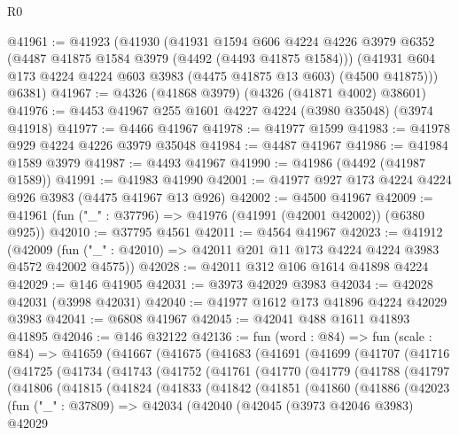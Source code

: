 \begin{lexlean}{R0}
\begin{coremodule}
@41961 := @41923
    (@41930
      (@41931
        @1594
        @606
        @4224
        @4226
        @3979
        @6352
        (@4487 @41875 @1584 @3979 (@4492 (@4493 @41875 @1584)))
        (@41931 @604 @173 @4224 @4224 @603 @3983 (@4475 @41875 @13 @603) (@4500 @41875)))
      @6381)
@41967 := @4326 (@41868 @3979) (@4326 (@41871 @4002) @38601)
@41976 := @4453 @41967 @255 @1601 @4227 @4224 (@3980 @35048) (@3974 @41918)
@41977 := @4466 @41967
@41978 := @41977 @1599
@41983 := @41978 @929 @4224 @4226 @3979 @35048
@41984 := @4487 @41967
@41986 := @41984 @1589 @3979
@41987 := @4493 @41967
@41990 := @41986 (@4492 (@41987 @1589))
@41991 := @41983 @41990
@42001 := @41977 @927 @173 @4224 @4224 @926 @3983 (@4475 @41967 @13 @926)
@42002 := @4500 @41967
@42009 := @41961 (fun ("_" : @37796) => @41976 (@41991 (@42001 @42002)) (@6380 @925))
@42010 := @37795 @4561
@42011 := @4564 @41967
@42023 := @41912
    (@42009 (fun ("_" : @42010) => @42011 @201 @11 @173 @4224 @4224 @3983 @4572 @42002 @4575))
@42028 := @42011 @312 @106 @1614 @41898 @4224
@42029 := @146 @41905
@42031 := @3973 @42029 @3983
@42034 := @42028 @42031 (@3998 @42031)
@42040 := @41977 @1612 @173 @41896 @4224 @42029 @3983
@42041 := @6808 @41967
@42045 := @42041 @488 @1611 @41893 @41895
@42046 := @146 @32122
@42136 := fun (word : @84) =>
  fun (scale : @84) =>
  @41659
    (@41667
      (@41675
        (@41683
          (@41691
            (@41699
              (@41707
                (@41716
                  (@41725
                    (@41734
                      (@41743
                        (@41752
                          (@41761
                            (@41770
                              (@41779
                                (@41788
                                  (@41797
                                    (@41806
                                      (@41815
                                        (@41824
                                          (@41833
                                            (@41842
                                              (@41851
                                                (@41860
                                                  (@41886
                                                    (@42023
                                                      (fun ("_" : @37809) =>
                                                      @42034
                                                        (@42040
                                                          (@42045
                                                            (@3973 @42046 @3983)
                                                            @42029

\end{coremodule}
\end{lexlean}
